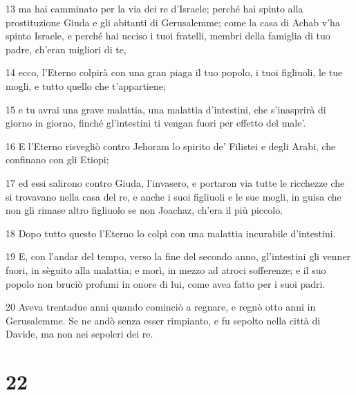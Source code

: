 \par 13 ma hai camminato per la via dei re d'Israele; perché hai spinto alla prostituzione Giuda e gli abitanti di Gerusalemme; come la casa di Achab v'ha spinto Israele, e perché hai ucciso i tuoi fratelli, membri della famiglia di tuo padre, ch'eran migliori di te,
\par 14 ecco, l'Eterno colpirà con una gran piaga il tuo popolo, i tuoi figliuoli, le tue mogli, e tutto quello che t'appartiene;
\par 15 e tu avrai una grave malattia, una malattia d'intestini, che s'inasprirà di giorno in giorno, finché gl'intestini ti vengan fuori per effetto del male'.
\par 16 E l'Eterno risvegliò contro Jehoram lo spirito de' Filistei e degli Arabi, che confinano con gli Etiopi;
\par 17 ed essi salirono contro Giuda, l'invasero, e portaron via tutte le ricchezze che si trovavano nella casa del re, e anche i suoi figliuoli e le sue mogli, in guisa che non gli rimase altro figliuolo se non Joachaz, ch'era il più piccolo.
\par 18 Dopo tutto questo l'Eterno lo colpì con una malattia incurabile d'intestini.
\par 19 E, con l'andar del tempo, verso la fine del secondo anno, gl'intestini gli venner fuori, in sèguito alla malattia; e morì, in mezzo ad atroci sofferenze; e il suo popolo non bruciò profumi in onore di lui, come avea fatto per i suoi padri.
\par 20 Aveva trentadue anni quando cominciò a regnare, e regnò otto anni in Gerusalemme. Se ne andò senza esser rimpianto, e fu sepolto nella città di Davide, ma non nei sepolcri dei re.

\chapter{22}

